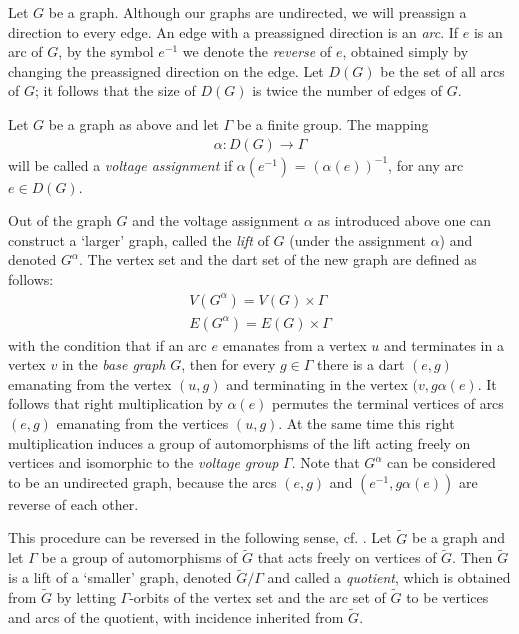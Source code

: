 \documentclass[a4paper,12pt,oneside]{report}%
\begin{document}
Let $G$ be a graph. Although our graphs are undirected, we will preassign a direction to every edge. An edge with a preassigned direction is an {\em arc}. If $e$ is an arc of $G$, by the symbol $e^{-1}$ we denote the {\em reverse} of $e$, obtained simply by changing the preassigned direction on the edge. Let $D(G)$ be the set of all arcs of $G$; it follows that the size of $D(G)$ is twice the number of edges of $G$.
\medskip

Let $G$ be a graph as above and let $\Gamma$ be a finite group. The mapping
\begin{align*}
	\alpha: D(G) \rightarrow \Gamma
\end{align*}	
will be called a {\em voltage assignment} if $\alpha(e^{-1})$ = $(\alpha(e))^{-1}$, for any arc $e \in D(G)$.
\medskip

Out of the graph $G$ and the voltage assignment $\alpha$ as introduced above one can construct a `larger' graph, called the {\em lift} of $G$ (under the assignment $\alpha$) and denoted $G^{\alpha}$. The vertex set and the dart set of the new graph are defined as follows:
\begin{align*}
	V(G^{\alpha}) = V(G) \times \Gamma \\
	E(G^{\alpha}) = E(G) \times \Gamma
\end{align*}	
with the condition that if an arc $e$ emanates from a vertex $u$ and terminates in a vertex $v$ in the {\em base graph} $G$, then for every $g\in \Gamma$ there is a dart $(e,g)$ emanating from the vertex $(u,g)$ and terminating in the vertex $(v,g\alpha(e)$. It follows that right multiplication by $\alpha(e)$ permutes the terminal vertices of arcs $(e,g)$ emanating from the vertices $(u,g)$. At the same time this right multiplication induces a group of automorphisms of the lift acting freely on vertices and isomorphic to the {\em voltage group} $\Gamma$. Note that $G^{\alpha}$ can be considered to be an undirected graph, because the arcs $(e,g)$ and $(e^{-1},g\alpha(e))$ are reverse of each other.    \medskip


This procedure can be reversed in the following sense, cf. \cite{Gro-Tuc}. Let $\tilde G$ be a graph and let $\Gamma$ be a group of automorphisms of $\tilde G$ that acts freely on vertices of $\tilde G$. Then $\tilde G$ is a lift of a `smaller' graph, denoted $\tilde G/\Gamma$ and called a {\em quotient}, which is obtained from $\tilde G$ by letting $\Gamma$-orbits of the vertex set and the arc set of $\tilde G$ to be vertices and arcs of the quotient, with incidence inherited from $\tilde G$.
\medskip
\end{document}
